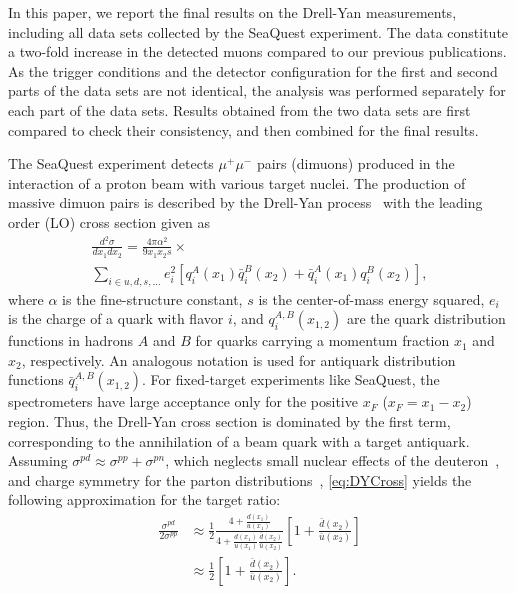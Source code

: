 \documentclass[reprint,aps,unsortedaddress,superscriptaddress,prl,floatfix,showpacs,linenumbers]{revtex4-2}
\begin{document}
In this paper, we report the final results on the Drell-Yan measurements,
including all data sets collected by the SeaQuest experiment.
The data constitute a two-fold increase in the detected muons compared
to our previous publications. As the trigger
conditions and the detector configuration for the first and second parts
of the data sets are not
identical, the analysis was performed separately for each part of the
data sets.
Results obtained from the two data sets are first compared to check their
consistency, and then combined for the final results.

The SeaQuest experiment detects $\mu^+\mu^-$ pairs (dimuons) produced in
the interaction of a proton beam with various target nuclei. The production
of massive dimuon pairs is described by the Drell-Yan
process~\cite{drell1970} with the leading order (LO) cross section given as
\begin{multline}
	\frac{d^2\sigma}{dx_1dx_2}=\frac{4\pi \alpha^2}{9x_1x_2s} \times
	\label{eq:DYCross} \\
	\sum_{i\in u,d,s,\dots} e_i^2 \left[q_i^A\left(x_1\right) \bar q_i^B\left(x_2\right) + \bar q_i^A\left(x_1\right)
		q_i^B\left(x_2\right)\right],
\end{multline}
where $\alpha$ is the fine-structure constant,
$s$ is the center-of-mass energy squared,
$e_i$ is the charge of a quark
with flavor $i$, and $q_i^{A,B}\left(x_{1,2}\right)$ are the quark
distribution functions in hadrons $A$ and $B$
for quarks carrying a momentum fraction $x_1$ and $x_2$, respectively.
An analogous notation is used for antiquark distribution functions
$\bar q_i^{A,B}\left(x_{1,2}\right)$.
For fixed-target experiments like SeaQuest, the spectrometers have
large acceptance only for the positive $x_F$ ($x_F = x_1 - x_2$) region. %
Thus, the Drell-Yan cross section is dominated by
the first term, corresponding to the annihilation of a beam quark with
a target antiquark. Assuming
$\sigma^{pd} \approx \sigma^{pp} + \sigma^{pn}$,
which neglects small nuclear effects of the
deuteron~\cite{kumano1998,ehlers2014},
and charge symmetry for the parton distributions~\cite{londergan2010},
\cref{eq:DYCross} yields the following approximation for the target ratio:
\begin{equation}
	\begin{split}
		\frac{\sigma^{pd}}{2\sigma^{pp}} & \approx
		\frac{1}{2} \frac{4+\frac{d\left(x_1\right)}
			{u\left(x_1\right)}}{4+\frac{d\left(x_1\right)}
			{u\left(x_1\right)}\frac{\bar d\left(x_2\right)}{\bar u\left(x_2\right)}}
		\left[1+\frac{\bar d\left(x_2\right)}{\bar u\left(x_2\right)}\right]                         \\
		                                 & \approx \frac{1}{2} \left[1+\frac{\bar d\left(x_2\right)}
			{\bar u\left(x_2\right)}\right].
	\end{split}
	\label{eq:crRatio}
\end{equation}
\end{document}
